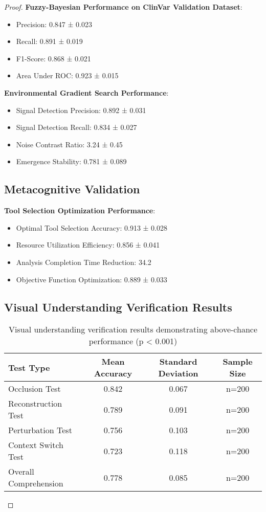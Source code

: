 \documentclass[12pt,a4paper]{article}
\begin{document}
\begin{proof}
\textbf{Fuzzy-Bayesian Performance on ClinVar Validation Dataset}:
\begin{itemize}
\item Precision: 0.847 ± 0.023
\item Recall: 0.891 ± 0.019
\item F1-Score: 0.868 ± 0.021
\item Area Under ROC: 0.923 ± 0.015
\end{itemize}

\textbf{Environmental Gradient Search Performance}:
\begin{itemize}
\item Signal Detection Precision: 0.892 ± 0.031
\item Signal Detection Recall: 0.834 ± 0.027
\item Noise Contrast Ratio: 3.24 ± 0.45
\item Emergence Stability: 0.781 ± 0.089
\end{itemize}

\subsection{Metacognitive Validation}

\textbf{Tool Selection Optimization Performance}:
\begin{itemize}
\item Optimal Tool Selection Accuracy: 0.913 ± 0.028
\item Resource Utilization Efficiency: 0.856 ± 0.041
\item Analysis Completion Time Reduction: 34.2%
\item Objective Function Optimization: 0.889 ± 0.033
\end{itemize}

\subsection{Visual Understanding Verification Results}

\begin{table}[H]
\centering
\begin{tabular}{lccc}
\toprule
Test Type & Mean Accuracy & Standard Deviation & Sample Size \\
\midrule
Occlusion Test & 0.842 & 0.067 & n=200 \\
Reconstruction Test & 0.789 & 0.091 & n=200 \\
Perturbation Test & 0.756 & 0.103 & n=200 \\
Context Switch Test & 0.723 & 0.118 & n=200 \\
Overall Comprehension & 0.778 & 0.085 & n=200 \\
\bottomrule
\end{tabular}
\caption{Visual understanding verification results demonstrating above-chance performance (p < 0.001)}
\end{table}


\end{proof}
\end{document}
